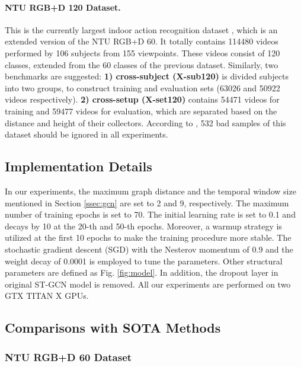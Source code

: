 \documentclass[sigconf]{acmart}
\begin{document}
\paragraph{NTU RGB+D 120 Dataset.} This is the currently largest indoor action recognition dataset \cite{liu2019ntu}, which is an extended version of the NTU RGB+D 60. It totally contains 114480 videos performed by 106 subjects from 155 viewpoints. These videos consist of 120 classes, extended from the 60 classes of the previous dataset. Similarly, two benchmarks are suggested: {\bf 1) cross-subject (X-sub120)} is divided subjects into two groups, to construct training and evaluation sets (63026 and 50922 videos respectively). {\bf 2) cross-setup (X-set120)} contains 54471 videos for training and 59477 videos for evaluation, which are separated based on the distance and height of their collectors. According to \cite{liu2019ntu}, 532 bad samples of this dataset should be ignored in all experiments.

\subsection{Implementation Details}
\label{ssec:Implementation}

In our experiments, the maximum graph distance  and the temporal window size  mentioned in Section \ref{ssec:gcn} are set to 2 and 9, respectively. The maximum number of training epochs is set to 70. The initial learning rate is set to 0.1 and decays by 10 at the 20-th and 50-th epochs. Moreover, a warmup strategy \cite{he2016deep} is utilized at the first 10 epochs to make the training procedure more stable. The stochastic gradient descent (SGD) with the Nesterov momentum of 0.9 and the weight decay of 0.0001 is employed to tune the parameters. Other structural parameters are defined as Fig. \ref{fig:model}. In addition, the dropout layer in original ST-GCN model \cite{yan2018spatial} is removed. All our experiments are performed on two GTX TITAN X GPUs.

\subsection{Comparisons with SOTA Methods}
\label{ssec:comparisons}

\subsubsection{NTU RGB+D 60 Dataset}
\label{sssec:ntu60}
\end{document}
